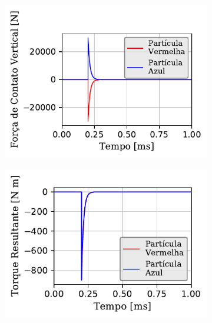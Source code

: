 \begin{figure}[H]
{\begin{subfigure}[t]{\smallresultsfigwidth}
			\label{subfig:colliding_spheres:dissipative_rotation:x_contact_force}
		\end{subfigure}
		\begin{subfigure}[t]{\smallresultsfigwidth}
			\centering
			\includegraphics[scale=0.95]{images/colliding_spheres/dissipative_rotation/contactForce-Y_small.pdf}
			\caption{}
			\label{subfig:colliding_spheres:dissipative_rotation:y_contact_force}
		\end{subfigure}
		\begin{subfigure}[t]{\smallresultsfigwidth}
			\centering
			\includegraphics[scale=0.95]{images/colliding_spheres/dissipative_rotation/resultingTorque-Z_small.pdf}
			\caption{}
			\label{subfig:colliding_spheres:dissipative_rotation:z_torque}
		\end{subfigure}
	}
	\label{fig:colliding_spheres:dissipative_rotation:dynamic_results}
	\sourceMe
\end{figure}

